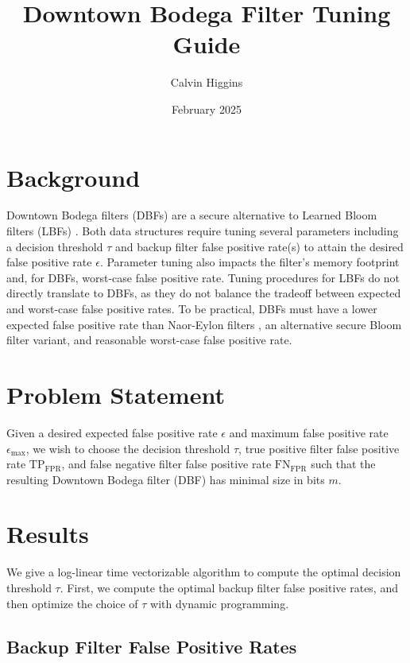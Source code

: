 \documentclass{article}
\title{Downtown Bodega Filter Tuning Guide}
\author{Calvin Higgins}
\date{February 2025}
\begin{document}
\maketitle

\section{Background}

Downtown Bodega filters (DBFs) \cite{bishop_tirmazi_2025} are a secure alternative to Learned Bloom filters (LBFs) \cite{kraska_beutel_chi_dean_polyzotis_2018}. Both data structures require tuning several parameters including a decision threshold $\tau$ and backup filter false positive rate(s) to attain the desired false positive rate $\epsilon$. Parameter tuning also impacts the filter's memory footprint and, for DBFs, worst-case false positive rate. Tuning procedures for LBFs do not directly translate to DBFs, as they do not balance the tradeoff between expected and worst-case false positive rates. To be practical, DBFs must have a lower expected false positive rate than Naor-Eylon filters \cite{naor_eylon_2019}, an alternative secure Bloom filter variant, and reasonable worst-case false positive rate.

\section{Problem Statement}

Given a desired expected false positive rate $\epsilon$ and maximum false positive rate $\epsilon_\text{max}$, we wish to choose the decision threshold $\tau$, true positive filter false positive rate $\text{TP}_\text{FPR}$, and false negative filter false positive rate $\text{FN}_\text{FPR}$ such that the resulting Downtown Bodega filter (DBF) has minimal size in bits $m$.

\section{Results}

We give a log-linear time vectorizable algorithm to compute the optimal decision threshold $\tau$. First, we compute the optimal backup filter false positive rates, and then optimize the choice of $\tau$ with dynamic programming. 

\subsection{Backup Filter False Positive Rates}
\label{section:backup_filter}
\end{document}
